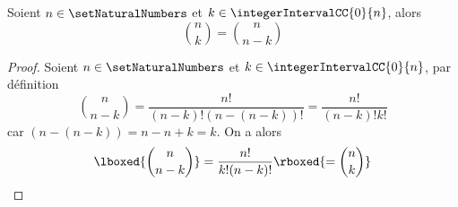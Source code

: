 \begin{property}
\label{binome:symetrie}
Soient $n \in \setNaturalNumbers$ et $k \in \integerIntervalCC{0}{n}$, alors 
\[
\binom{n}{k} = \binom{n}{n-k}
\]
\end{property}

\begin{proof}
Soient $n \in \setNaturalNumbers$ et $k \in \integerIntervalCC{0}{n}$, par définition
\[
\binom{n}{n-k} = \dfrac{n!}{(n-k)!(n-(n-k))!}= \dfrac{n!}{(n-k)!k!}
\]
car $(n-(n-k))= n-n+ k = k$. On a alors
\[
\lboxed{\displaystyle\binom{n}{n-k}} =\dfrac{n!}{k!(n-k)!} \rboxed{=\displaystyle\binom{n}{k}}
\]
\end{proof}